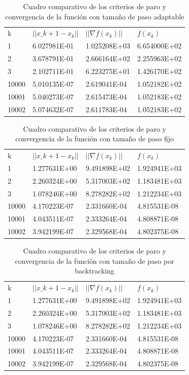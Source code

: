 \documentclass[journal]{IEEEtran}
\begin{document}
\begin{table}[H]
\begin{tabular}{@{}llll@{}}
k & $||x\_{k+1}-x_k||$ & $||\nabla f(x_k)||$ & $f(x_k)$ \\
1  &  6.027981E-01 &  1.025208E+03   &  6.654000E+02  \\
2  &  3.678791E-01 &  2.666164E+02   &  2.255963E+02  \\
3  &  2.102711E-01 &  6.223275E+01   &  1.426170E+02  \\
10000  &  5.010135E-07 &  2.619041E-04   &  1.052182E+02 \\
10001  &  5.040273E-07 &  2.615473E-04   &  1.052183E+02  \\
10002  &  5.074632E-07 &  2.611783E-04   &  1.052183E+02
\end{tabular}
\caption{Cuadro comparativo de los criterios de paro y convergencia de la función con tamaño de paso adaptable}
\end{table}

\begin{table}[H]
\begin{tabular}{@{}llll@{}}
k & $||x\_{k+1}-x_k||$ & $||\nabla f(x_k)||$ & $f(x_k)$ \\
1  &  1.277631E+00 &  9.491898E+02   &  1.924941E+03  \\
2  &  2.260324E+00 &  5.317003E+02   &  1.183481E+03  \\
3  &  1.078246E+00 &  8.278282E+02   &  1.212234E+03  \\
10000  &  4.170223E-07 &  2.331660E-04   &  4.815531E-08 \\
10001  &  4.043511E-07 &  2.333264E-04   &  4.808871E-08  \\
10002  &  3.942199E-07 &  2.329568E-04   &  4.802375E-08
\end{tabular}
\caption{Cuadro comparativo de los criterios de paro y convergencia de la función con tamaño de paso fijo}
\end{table}


\begin{table}[H]
\begin{tabular}{@{}llll@{}}
k & $||x\_{k+1}-x_k||$ & $||\nabla f(x_k)||$ & $f(x_k)$ \\
1  &  1.277631E+00 &  9.491898E+02   &  1.924941E+03  \\
2  &  2.260324E+00 &  5.317003E+02   &  1.183481E+03  \\
3  &  1.078246E+00 &  8.278282E+02   &  1.212234E+03  \\
10000  &  4.170223E-07 &  2.331660E-04   &  4.815531E-08 \\
10001  &  4.043511E-07 &  2.333264E-04   &  4.808871E-08  \\
10002  &  3.942199E-07 &  2.329568E-04   &  4.802375E-08
\end{tabular}
\caption{Cuadro comparativo de los criterios de paro y convergencia de la función con tamaño de paso por backtracking}
\end{table}
\end{document}

